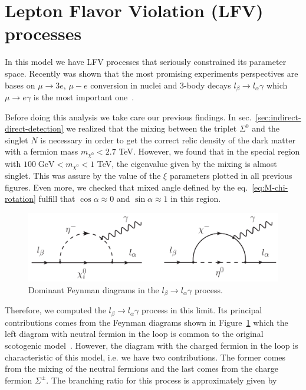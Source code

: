 \documentclass[12pt,letterpaper]{article}
\begin{document}
\section{Lepton Flavor Violation (LFV) processes}
\label{sec:LFV}

In this model we have LFV processes that seriously constrained its parameter space. Recently was shown that the most promising experiments perspectives are bases on $\mu\rightarrow 3 e$, $\mu - e$ conversion in nuclei and 3-body decays $l_{\beta}\rightarrow l_{\alpha}\gamma$ which $\mu\rightarrow e\gamma$ is the most important one~\cite{Rocha-Moran:2016enp}. 

Before doing this analysis we take care our previous findings. In sec.~\ref{sec:indirect-direct-detection} we realized that the mixing between the triplet $\Sigma^0$ and the singlet $N$ is necessary in order to get the correct relic density of the dark matter with a fermion mass $m_{\chi^0} < 2.7$ TeV. However, we found that in the special region with $100\; \text{GeV} < m_{\chi^0} < 1$ TeV, the eigenvalue given by the mixing is almost singlet. This was assure by the value of the $\xi$ parameters plotted in all previous figures. 
Even more, we checked that mixed angle defined by the eq.~\ref{eq:M-chi-rotation} fulfill that $\cos\alpha\approx 0$ and $\sin\alpha\approx 1$ in this region. 
%
\begin{figure}
\begin{center}
\includegraphics[scale=0.55]{LFV-diagrams}
\caption{Dominant Feynman diagrams in the $l_{\beta}\rightarrow l_{\alpha}\gamma$ process.}
\label{fig:mu-e-gamma}
\end{center}
\end{figure}
%
Therefore, we computed the $l_{\beta}\rightarrow l_{\alpha}\gamma$ process in this limit.
Its principal contributions comes from the Feynman diagrams shown in Figure~\ref{fig:mu-e-gamma} which the left diagram with neutral fermion in the loop is common to the original scotogenic model~\cite{Toma:2013zsa,Ibarra:2016dlb}. However, the diagram with the charged fermion in the loop is characteristic of this model, i.e. we have two contributions. The former comes from the mixing of the neutral fermions and the last comes from the charge fermion $\Sigma^{\pm}$. The branching ratio for this process is approximately given by
\end{document}
